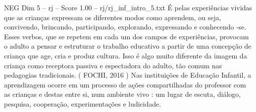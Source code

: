 \begin{textsample}{NEG Dim 5 – rj – Score 1.00 – rj/rj\_inf\_intro\_5.txt}
É pelas experiências vividas que as crianças expressam os diferentes modos como aprendem, ou seja, convivendo, brincando, participando, explorando, expressando e conhecendo -se.
Esses verbos, que se repetem em cada um dos campos de experiências, provocam o adulto a pensar e estruturar o trabalho educativo a partir de uma concepção de criança que age, cria e produz cultura.
Isso é algo muito diferente da imagem da criança como receptora passiva e espectadora do adulto, tão comum nas pedagogias tradicionais. ( FOCHI, 2016 ) Nas instituições de Educação Infantil, a aprendizagem ocorre em um processo de ações compartilhadas do professor com as crianças e destas entre si, num ambiente vivo : um lugar de escuta, diálogo, pesquisa, cooperação, experimentações e ludicidade.

\end{textsample}

